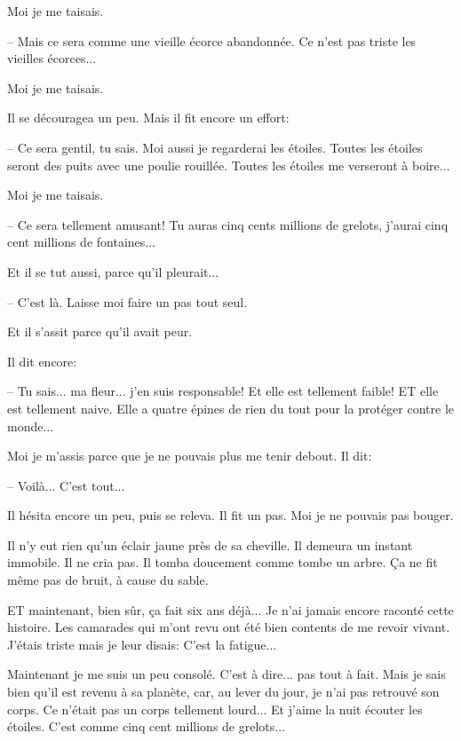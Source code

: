 \documentclass[a4paper]{report}
\begin{document}
Moi je me taisais.

-- Mais ce sera comme une vieille écorce abandonnée. Ce n'est pas triste les vieilles écorces...

Moi je me taisais.

Il se découragea un peu. Mais il fit encore un effort:

-- Ce sera gentil, tu sais. Moi aussi je regarderai les étoiles. Toutes les étoiles seront des puits avec une poulie rouillée. Toutes les étoiles me verseront à boire...

Moi je me taisais.

-- Ce sera tellement amusant! Tu auras cinq cents millions de grelots, j'aurai cinq cent millions de fontaines...

Et il se tut aussi, parce qu'il pleurait...

-- C'est là. Laisse moi faire un pas tout seul.

Et il s'assit parce qu'il avait peur. 


Il dit encore:

-- Tu sais... ma fleur... j'en suis responsable! Et elle est tellement faible! ET elle est tellement naive. Elle a quatre épines de rien du tout pour la protéger contre le monde... 


Moi je m'assis parce que je ne pouvais plus me tenir debout. Il dit:

-- Voilà... C'est tout...

Il hésita encore un peu, puis se releva. Il fit un pas. Moi je ne pouvais pas bouger.

Il n'y eut rien qu'un éclair jaune près de sa cheville. Il demeura un instant immobile. Il ne cria pas. Il tomba doucement comme tombe un arbre. Ça ne fit même pas de bruit, à cause du sable. 


\parachapter{} %

ET maintenant, bien sûr, ça fait six ans déjà... Je n'ai jamais encore raconté cette histoire. Les camarades qui m'ont revu ont été bien contents de me revoir vivant. J'étais triste mais je leur disais: C'est la fatigue...

Maintenant je me suis un peu consolé. C'est à dire... pas tout à fait. Mais je sais bien qu'il est revenu à sa planète, car, au lever du jour, je n'ai pas retrouvé son corps. Ce n'était pas un corps tellement lourd... Et j'aime la nuit écouter les étoiles. C'est comme cinq cent millions de grelots...
\end{document}
